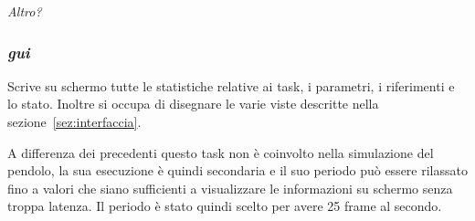 \textit{Altro?}

\subsubsection{\textit{gui}}
Scrive su schermo tutte le statistiche relative ai task, i parametri, i riferimenti e lo stato. Inoltre si occupa di disegnare le varie viste descritte nella sezione~\ref{sez:interfaccia}. 

A differenza dei precedenti questo task non \`e coinvolto nella simulazione del pendolo, la sua esecuzione \`e quindi secondaria e il suo periodo pu\`o essere rilassato fino a valori che siano sufficienti a visualizzare le informazioni su schermo senza troppa latenza. Il periodo \`e stato quindi scelto per avere 25 frame al secondo.













